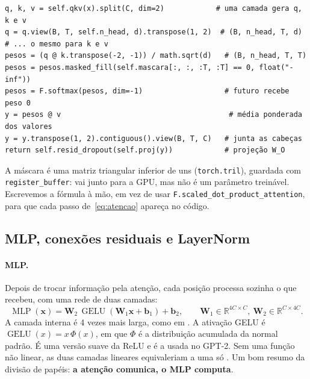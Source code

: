 \documentclass[11pt,a4paper]{article}
\newcommand{\R}{\mathbb{R}}
\begin{document}
\begin{nocodigo}
\begin{lstlisting}
q, k, v = self.qkv(x).split(C, dim=2)            # uma camada gera q, k e v
q = q.view(B, T, self.n_head, d).transpose(1, 2)  # (B, n_head, T, d)
# ... o mesmo para k e v
pesos = (q @ k.transpose(-2, -1)) / math.sqrt(d)   # (B, n_head, T, T)
pesos = pesos.masked_fill(self.mascara[:, :, :T, :T] == 0, float("-inf"))
pesos = F.softmax(pesos, dim=-1)                   # futuro recebe peso 0
y = pesos @ v                                       # média ponderada dos valores
y = y.transpose(1, 2).contiguous().view(B, T, C)   # junta as cabeças
return self.resid_dropout(self.proj(y))            # projeção W_O
\end{lstlisting}
A máscara é uma matriz triangular inferior de uns (\texttt{torch.tril}), guardada com \texttt{register\_buffer}: vai junto para a GPU, mas não é um parâmetro treinável. Escrevemos a fórmula à mão, em vez de usar \texttt{F.scaled\_dot\_product\_attention}, para que cada passo de~\eqref{eq:atencao} apareça no código.
\end{nocodigo}

\subsection{MLP, conexões residuais e LayerNorm}

\paragraph{MLP.} Depois de trocar informação pela atenção, cada posição processa sozinha o que recebeu, com uma rede de duas camadas:
\begin{equation}
\operatorname{MLP}(\bm x) = \bm W_2\, \operatorname{GELU}(\bm W_1 \bm x + \bm b_1) + \bm b_2,
\qquad \bm W_1 \in \R^{4C\times C},\ \bm W_2 \in \R^{C\times 4C}.
\end{equation}
A camada interna é 4 vezes mais larga, como em \cite{vaswani}. A ativação GELU \cite{gelu} é $\operatorname{GELU}(x) = x\,\Phi(x)$, em que $\Phi$ é a distribuição acumulada da normal padrão. É uma versão suave da ReLU e é a usada no GPT-2. Sem uma função não linear, as duas camadas lineares equivaleriam a uma só \cite[cap.~6]{goodfellow}. Um bom resumo da divisão de papéis: \textbf{a atenção comunica, o MLP computa}.
\end{document}
